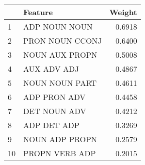 \begin{tabular}{llr}
\toprule
{} &          Feature &  Weight \\
\midrule
1  &    ADP NOUN NOUN &  0.6918 \\
2  &  PRON NOUN CCONJ &  0.6400 \\
3  &   NOUN AUX PROPN &  0.5008 \\
4  &      AUX ADV ADJ &  0.4867 \\
5  &   NOUN NOUN PART &  0.4611 \\
6  &     ADP PRON ADV &  0.4458 \\
7  &     DET NOUN ADV &  0.4212 \\
8  &      ADP DET ADP &  0.3269 \\
9  &   NOUN ADP PROPN &  0.2579 \\
10 &   PROPN VERB ADP &  0.2015 \\
\bottomrule
\end{tabular}
